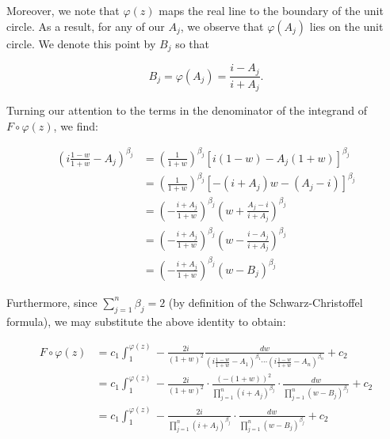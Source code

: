 \begin{solution}
  Moreover, we note that $\varphi(z)$ maps the real line to the boundary of the unit circle. As a result, for any of our 
  $A_j$, we observe that $\varphi(A_j)$ lies on the unit circle. We denote this point by $B_j$ so that

  $$
  B_j = \varphi(A_j) = \frac{i - A_j}{i + A_j}.
  $$

  \pagebreak
  Turning our attention to the terms in the denominator of the integrand of $F \circ \varphi(z)$, we find:

  \begin{align*}
    \left(i \frac{1-w}{1+w} - A_j\right)^{\beta_j} 
      &= \left(\frac{1}{1 + w}\right)^{\beta_j} \left[ i (1 - w) - A_j (1 + w) \right]^{\beta_j} \\
      &= \left(\frac{1}{1 + w}\right)^{\beta_j} \left[ -(i + A_j) w  - (A_j - i) \right]^{\beta_j} \\
      &= \left(-\frac{i + A_j}{1 + w}\right)^{\beta_j} \left( w  + \frac{A_j - i}{i + A_j} \right)^{\beta_j} \\
      &= \left(-\frac{i + A_j}{1 + w}\right)^{\beta_j} \left( w  - \frac{i - A_j}{i + A_j} \right)^{\beta_j} \\
      &= \left(-\frac{i + A_j}{1 + w}\right)^{\beta_j} \left( w  - B_j \right)^{\beta_j}
  \end{align*}

  Furthermore, since $\sum\limits_{j=1}^n \beta_j = 2$ (by definition of the Schwarz-Christoffel formula), we may 
  substitute the above identity to obtain:

  \begin{align*}
  F \circ \varphi(z) &= c_1 \int_1^{\varphi(z)} -\frac{2 i }{(1 + w)^2} 
                                                 \frac{dw}{\left( i \frac{1 - w}{1 + w} - A_1 \right)^{\beta_1} \cdots \left( i \frac{1 - w}{1 + w}  - A_n \right)^{\beta_n}} + c_2 \\
                     &= c_1 \int_1^{\varphi(z)} -\frac{2 i }{(1 + w)^2} \cdot
                                                 \frac{(-(1 + w))^2}{\prod_{j=1}^n (i + A_j)^{\beta_j}} \cdot
                                                 \frac{dw}{\prod_{j=1}^n \left( w - B_j \right)^{\beta_j}} + c_2 \\
                     &= c_1 \int_1^{\varphi(z)} -\frac{2 i }{\prod_{j=1}^n (i + A_j)^{\beta_j}} \cdot
                                                 \frac{dw}{\prod_{j=1}^n \left( w - B_j \right)^{\beta_j}} + c_2
  \end{align*}


\end{solution}
